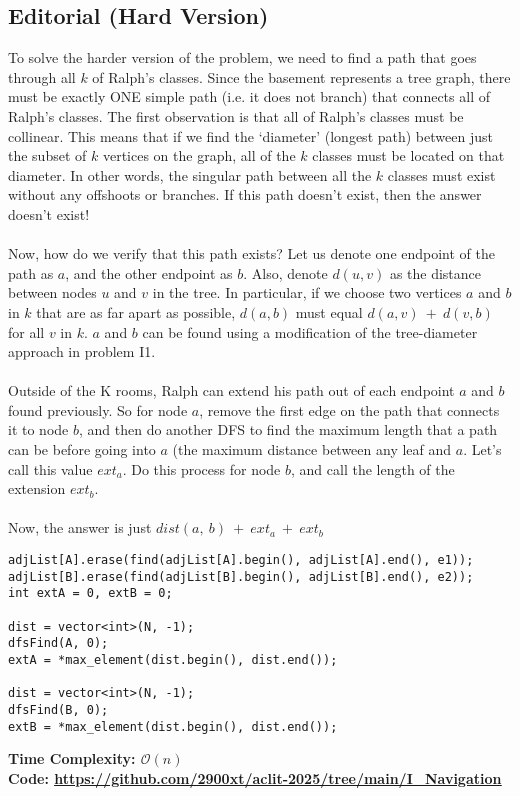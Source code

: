 \documentclass{article}
\newcommand{\link}[1]{\textcolor{blue!50!black}{\uline{\url{#1}}}}
\begin{document}
\subsection{Editorial (Hard Version)}
To solve the harder version of the problem, we need to find a path that goes through all $k$ of Ralph's classes. Since the basement represents a tree graph, there must be exactly ONE simple path (i.e. it does not branch) that connects all of Ralph's classes. The first observation is that all of Ralph's classes must be collinear. This means that if we find the `diameter' (longest path) between just the subset of $k$ vertices on the graph, all of the $k$ classes must be located on that diameter. In other words, the singular path between all the $k$ classes must exist without any offshoots or branches. If this path doesn't exist, then the answer doesn't exist!
\\\\
Now, how do we verify that this path exists? Let us denote one endpoint of the path as $a$, and the other endpoint as $b$. Also, denote $d(u, v)$ as the distance between nodes $u$ and $v$ in the tree. In particular, if we choose two vertices $a$ and $b$ in $k$ that are as far apart as possible, $d(a,b)$ must equal $d(a,v)\ +\ d(v,b)$ for all $v$ in $k$. $a$ and $b$ can be found using a modification of the tree-diameter approach in problem I1.
\\\\
Outside of the K rooms, Ralph can extend his path out of each endpoint $a$ and $b$ found previously. So for node $a$, remove the first edge on the path that connects it to node $b$, and then do another DFS to find the maximum length that a path can be before going into $a$ (the maximum distance between any leaf and $a$. Let's call this value $ext_a$. Do this process for node $b$, and call the length of the extension $ext_b$.\\\\
Now, the answer is just $dist(a,\ b)\ +\ ext_a\ +\ ext_b$
\begin{lstlisting}
adjList[A].erase(find(adjList[A].begin(), adjList[A].end(), e1));
adjList[B].erase(find(adjList[B].begin(), adjList[B].end(), e2));
int extA = 0, extB = 0;
 
dist = vector<int>(N, -1);
dfsFind(A, 0);
extA = *max_element(dist.begin(), dist.end());
 
dist = vector<int>(N, -1);
dfsFind(B, 0);
extB = *max_element(dist.begin(), dist.end());
\end{lstlisting}
\textbf{Time Complexity: $\mathcal{O}(n)$}\\
\textbf{Code: \link{https://github.com/2900xt/aclit-2025/tree/main/I_Navigation}}
\end{document}
